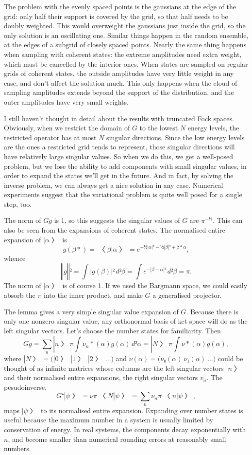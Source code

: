The problem with the evenly spaced points is the gaussians at the edge of the grid: only half their support is covered by the grid, so that half needs to be doubly weighted.  This would overweight the gaussians just inside the grid, so the only solution is an oscillating one.  Similar things happen in the random ensemble, at the edges of a subgrid of closely spaced points.  Nearly the same thing happens when sampling with coherent states: the extreme amplitudes need extra weight, which must be cancelled by the interior ones.  When states are sampled on regular grids of coherent states, the outside amplitudes have very little weight in any case, and don't affect the solution much.  This only happens when the cloud of sampling amplitudes extends beyond the support of the distribution, and the outer amplitudes have very small weights.
\endinsert


I still haven't thought in detail about the results with truncated Fock spaces.  Obviously, when we restrict the domain of $G$ to the lowest $N$ energy levels, the restricted operator has at most $N$ singular directions.  Since the low energy levels are the ones a restricted grid tends to represent, those singular directions will have relatively large singular values.  So when we do this, we get a well-posed problem, but we lose the ability to add components with small singular values, in order to expand the states we'll get in the future.  And in fact, by solving the inverse problem, we can always get a nice solution in any case.  Numerical experiments suggest that the variational problem is quite well posed for a single step, too.

The norm of $Gg$ is 1, so this suggests the singular values of $G$ are $π^{-½}$.  This can also be seen from the expansions of coherent states.  The normalised entire expansion of $|α〉$ is
$$g(β*)=〈β|α〉=e^{-½|α|²-½|β|²+β*α},$$
whence
$$‖g‖²=\int |g(β)|²\,d²β=\int e^{-|β-α|²}\,d²β=π.$$
The norm of $|α〉$ is of course 1.  If we used the Bargmann space, we could easily absorb the $π$ into the inner product, and make $G$ a generalised projector.

The lemma gives a very simple singular value expansion of $G$.  Because there is only one nonzero singular value, any orthonormal basis of ket space will do as the left singular vectors.  Let's choose the number states for familiarity.  Then
$$Gg=∑_n |n〉π\int ν_n*(α)g(α)\,d²α=|N〉π\int ν*(α)g(α),$$
where $|N〉=\bigl(|0〉\ |1〉\ |2〉\ …\bigr)$ and $ν(α)=\bigl(ν₀(α)\ ν₁(α)\ …\bigr)$ could be thought of as infinite matrices whose columns are the left singular vectors $|n〉$ and their normalised entire expansions, the right singular vectors $v_n$.  The pesudoinverse, 
$$G⁺|ψ〉=νπ〈N|ψ〉= ∑_n ν_nπ〈n|ψ〉,$$
maps $|ψ〉$ to its normalised entire expansion.  Expanding over number states is useful because the maximum number in a system is usually limited by conservation of energy.  In real systems, the components decay exponentially with $n$, and become smaller than numerical rounding errors at reasonably small numbers.

